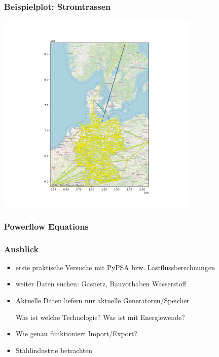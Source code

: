 \documentclass[aspectratio=169,t]{beamer}
\begin{document}
	\begin{frame}
		\frametitle{Beispielplot: Stromtrassen}
		\vspace*{-1.8cm}
		\hspace*{6cm}
		\includegraphics[height=10cm]{./line.png}
	\end{frame}

	\begin{frame}
		\frametitle{Powerflow Equations}
		
	\end{frame}
	
	

	
	
	\begin{frame}
		\frametitle{Ausblick}
		
		\vspace*{6mm}
		\begin{itemize}
			\item erste praktische Versuche mit PyPSA bzw. Lastflussberechnungen
			\item weiter Daten suchen: Gasnetz, Bauvorhaben Wasserstoff
			\item Aktuelle Daten liefern nur aktuelle Generatoren/Speicher
			
			Was ist welche Technologie? Was ist mit Energiewende?
			\item Wie genau funktioniert Import/Export?
			\item Stahlindustrie betrachten
		\end{itemize}
			
		
	\end{frame}
	
	
	
	
	
	
	
\end{document}
